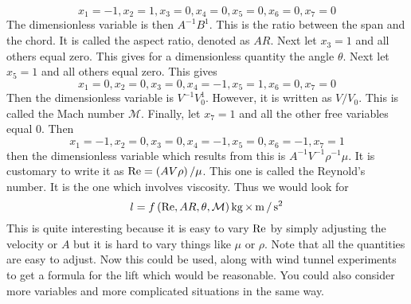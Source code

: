\begin{equation*}
x_{1}=-1,x_{2}=1,x_{3}=0,x_{4}=0,x_{5}=0,x_{6}=0,x_{7}=0
\end{equation*}
The dimensionless variable is then $A^{-1}B^{1}$. This is the ratio between
the span and the chord. It is called the aspect ratio, denoted as $AR$. Next
let $x_{3}=1$ and all others equal zero. This gives for a dimensionless
quantity the angle $\theta $. Next let $x_{5}=1$ and all others equal zero.
This gives
\begin{equation*}
x_{1}=0,x_{2}=0,x_{3}=0,x_{4}=-1,x_{5}=1,x_{6}=0,x_{7}=0
\end{equation*}
Then the dimensionless variable is $V^{-1}V_{0}^{1}.$ However, it is written
as $V/V_{0}$. This is called the Mach number $\mathcal{M}$. Finally, let 
$x_{7}=1$ and all the other free variables equal 0. Then 
\begin{equation*}
x_{1}=-1,x_{2}=0,x_{3}=0,x_{4}=-1,x_{5}=0,x_{6}=-1,x_{7}=1
\end{equation*}
then the dimensionless variable which results from this is $A^{-1}V^{-1}\rho
^{-1}\mu .$ It is customary to write it as $\mbox{Re}=\left( AV\rho \right)
/\mu $. This one is called the Reynold's number. It is the one which
involves viscosity. Thus we would look for 
\begin{equation*}
l=f\left( \mbox{Re},AR,\theta ,\mathcal{M}\right) \mathop{\textrm{kg}}\nolimits\times \mathop{\textrm{m}}\nolimits/\mathop{\textrm{s}}\nolimits ^{2}
\end{equation*}
This is quite interesting because it is easy to vary $\mbox{Re}$ by simply
adjusting the velocity or $A$ but it is hard to vary things like $\mu $ or $%
\rho $. Note that all the quantities are easy to adjust. Now this could be
used, along with wind tunnel experiments to get a formula for the lift which
would be reasonable. You could also consider more variables and more
complicated situations in the same way.

\endgroup

